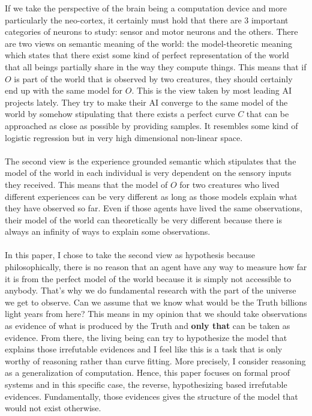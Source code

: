 If we take the perspective of the brain being a computation device and more particularly the neo-cortex, it certainly must hold that there are 3 important categories of neurons to study: sensor and motor neurons and the others. There are two views on semantic meaning of the world: the model-theoretic meaning which states that there exist some kind of perfect representation of the world that all beings partially share in the way they compute things. This means that if $O$ is part of the world that is observed by two creatures, they should certainly end up with the same model for $O$. This is the view taken by most leading AI projects lately. They try to make their AI converge to the same model of the world by somehow stipulating that there exists a perfect curve $C$ that can be approached as close as possible by providing samples. It resembles some kind of logistic regression but in very high dimensional non-linear space.\\
\\
The second view is the experience grounded semantic which stipulates that the model of the world in each individual is very dependent on the sensory inputs they received. This means that the model of $O$ for two creatures who lived different experiences can be very different as long as those models explain what they have observed so far. Even if those agents have lived the same observations, their model of the world can theoretically be very different because there is always an infinity of ways to explain some observations.\\
\\
In this paper, I chose to take the second view as hypothesis because philosophically, there is no reason that an agent have any way to measure how far it is from the perfect model of the world because it is simply not accessible to anybody. That's why we do fundamental research with the part of the universe we get to observe. Can we assume that we know what would be the Truth billions light years from here? This means in my opinion that we should take observations as evidence of what is produced by the Truth and \textbf{only that} can be taken as evidence. From there, the living being can try to hypothesize the model that explains those irrefutable evidences and I feel like this is a task that is only worthy of reasoning rather than curve fitting. More precisely, I consider reasoning as a generalization of computation. Hence, this paper focuses on formal proof systems and in this specific case, the reverse, hypothesizing based irrefutable evidences. Fundamentally, those evidences gives the structure of the model that would not exist otherwise.

